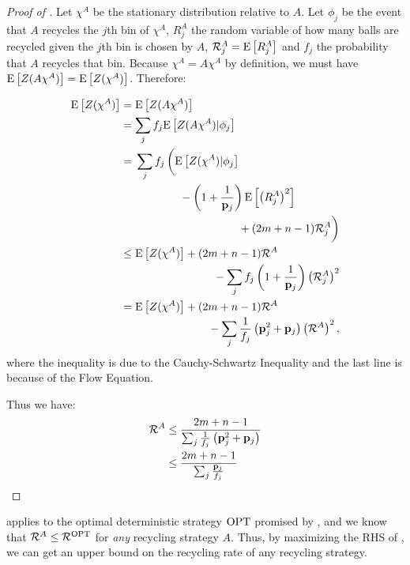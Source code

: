 \begin{proof}[Proof of ]
	Let $\chi^A$ be the stationary distribution relative to $A$. Let $\phi_j$
	be the event that $A$ recycles the $j$th bin of $\chi^A$, $R_j^A$ the
	random variable of how many balls are recycled given the $j$th bin is
	chosen by $A$, $\mathcal{R}_j^A=\mathrm{E}\left[R_j^A\right]$ and $f_j$ the probability that
	$A$ recycles that bin.  Because $\chi^A = A\chi^A$ by definition, we must
	have $\mathrm{E}\left[Z(A\chi^A)\right] = \mathrm{E}\left[Z(\chi^A)\right]$. Therefore:

	\begin{align*}
	\E{Z(\chi^A)} &= \E{Z(A\chi^A)}\\
	  			  &= \sum_j f_j \E{Z(A\chi^A)|\phi_j} \\
				  &= \begin{multlined}[t][6.5cm]\sum_j f_j \left(\E{Z(\chi^A)|\phi_j}
					  \vphantom{\left(1+\frac{1}{\p_j}\right)} \right. \\
					  - \left(1+\frac{1}{\p_j}\right)\E{\left(R_j^A\right)^2} \\
					  \left. \vphantom{\left(1+\frac{1}{\p_j}\right)} + (2m+n-1)\mathcal{R}_j^A\right) \end{multlined} \\
				  &\leq \begin{multlined}[t][6.5cm]\E{Z(\chi^A)} + (2m+n-1)\mathcal{R}^A \\
					  - \sum_j f_j\left(1 +\frac{1}{\p_j}\right)\left(\mathcal{R}_j^A\right)^2 \end{multlined} \\
				  &= \begin{multlined}[t][6.5cm]\E{Z(\chi^A)} + (2m+n-1)\mathcal{R}^A \\
					  - \sum_j \frac{1}{f_j}\left(\p_j^2 +\p_j\right)\left(\mathcal{R}^A\right)^2, \end{multlined}
	\end{align*}
	where the inequality is due to the Cauchy-Schwartz Inequality and the last
	line is because of the Flow Equation.
	
	Thus we have:
	\begin{align*}
		\mathcal{R}^A &\leq \frac{2m+n-1}{\sum_j \frac{1}{f_j}\left(\mathbf{p}_j^2 +\mathbf{p}_j\right)} \\
					&\leq \frac{2m+n-1}{\sum_j \frac{\mathbf{p}_j}{f_j}}
	\end{align*}
\end{proof}

 applies to the optimal deterministic strategy $\mathrm{OPT}$
promised by , and we know that $\mathcal{R}^A\leq
\mathcal{R}^{\mathrm{OPT}}$ for \textit{any} recycling strategy $A$.  Thus, by maximizing
the RHS of , we can get an upper bound on the recycling
rate of any recycling strategy.

